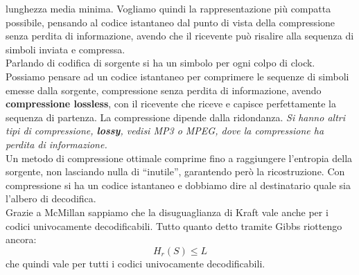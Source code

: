 \documentclass[a4paper,12pt, oneside]{book}
\begin{document}
lunghezza media minima. Vogliamo quindi la rappresentazione più compatta
possibile, pensando al codice istantaneo dal punto di vista della compressione
senza perdita di informazione, avendo che il ricevente può risalire alla
sequenza di simboli inviata e compressa.\\
Parlando di codifica di sorgente si ha un simbolo per ogni colpo di
clock. Possiamo pensare ad un codice istantaneo per comprimere le sequenze di
simboli emesse dalla sorgente, compressione senza perdita di informazione,
avendo \textbf{compressione lossless}, con il
ricevente che riceve e capisce perfettamente la sequenza di partenza. La
compressione dipende dalla ridondanza.
\textit{Si hanno altri tipi di compressione, \textbf{lossy}, vedisi MP3 o MPEG,
  dove la compressione ha perdita di informazione.}\\
Un metodo di compressione ottimale comprime fino a raggiungere l'entropia della
sorgente, non lasciando nulla di ``inutile'', garantendo però la
ricostruzione. Con compressione si ha un codice istantaneo e dobbiamo dire al
destinatario quale sia l'albero di decodifica. \\
Grazie a McMillan sappiamo che la disuguaglianza di Kraft vale anche per i
codici univocamente decodificabili. Tutto quanto detto tramite Gibbs riottengo
ancora:
\[H_r(S)\leq L\]
che quindi vale per tutti i codici univocamente decodificabili.\\
\end{document}
